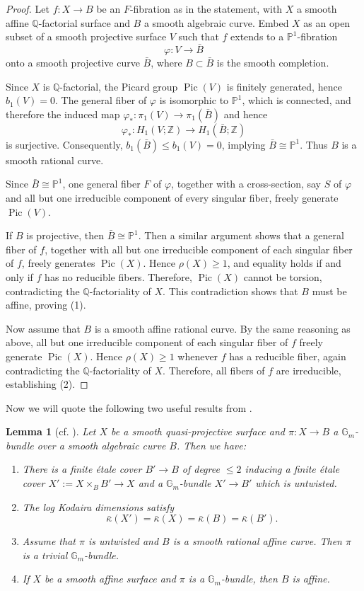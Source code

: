 \documentclass[12pt,reqno,twoside]{amsart}
\newtheorem{lemma}[theorem]{Lemma}
\theoremstyle{definition}
\numberwithin{equation}{section}
\newcommand{\G}{\mathbb{G}}
\newcommand{\Q}{\mathbb{Q}}
\newcommand{\Z}{\mathbb{Z}}
\newcommand{\Kbar}{\bar{\kappa}}
\newcommand{\PP}{\mathbb{P}}
\newcommand{\Pic}{\operatorname{Pic}}
\begin{document}
\begin{proof}
Let $f : X \to B$ be an $F$-fibration as in the statement, with $X$ a smooth affine $\Q$-factorial surface and $B$ a smooth algebraic curve. Embed $X$ as an open subset of a smooth projective surface $V$ such that $f$ extends to a $\PP^1$-fibration 
\[
\varphi : V \to \bar{B}
\]
onto a smooth projective curve $\bar{B}$, where $B \subset \bar{B}$ is the smooth completion.

Since $X$ is $\Q$-factorial, the Picard group $\Pic(V)$ is finitely generated, hence $b_1(V)=0$. The general fiber of $\varphi$ is isomorphic to $\PP^1$, which is connected, and therefore the induced map $\varphi_\ast : \pi_1(V) \to \pi_1(\bar{B})$ and hence
\[
\varphi_\ast : H_1(V; \Z) \to H_1(\bar{B}; \Z)
\]
is surjective. Consequently, $b_1(\bar{B}) \le b_1(V) = 0$, implying $\bar{B} \cong \PP^1$. Thus $B$ is a smooth rational curve.

Since $\bar{B} \cong \PP^1$, one general fiber $F$ of $\varphi$, together with a cross-section, say $S$ of $\varphi$ and all but one irreducible component of every singular fiber, freely generate $\Pic(V)$.  

If $B$ is projective, then $\bar{B} \cong \PP^1$. Then a similar argument shows that a general fiber of $f$, together with all but one irreducible component of each singular fiber of $f$, freely generates $\Pic(X)$. Hence $\rho(X) \ge 1$, and equality holds if and only if $f$ has no reducible fibers. Therefore, $\Pic(X)$ cannot be torsion, contradicting the $\Q$-factoriality of $X$. This contradiction shows that $B$ must be affine, proving (1).

Now assume that $B$ is a smooth affine rational curve. By the same reasoning as above, all but one irreducible component of each singular fiber of $f$ freely generate $\Pic(X)$. Hence $\rho(X) \ge 1$ whenever $f$ has a reducible fiber, again contradicting the $\Q$-factoriality of $X$. Therefore, all fibers of $f$ are irreducible, establishing (2).
\end{proof}


Now we will quote the following two useful results from \cite{JSXZ2024}. 

\begin{lemma}[{cf. \cite[Lemma 2.6, Corollary 2.7]{JSXZ2024}}]
Let $X$ be a smooth quasi-projective surface and $\pi : X \to B$ a $\G_m$-bundle over a smooth algebraic curve $B$. Then we have:
\begin{enumerate}[\indent\rm(1)]
    \item There is a finite {\'e}tale cover $B'\to B$ of degree $\leq 2$ inducing a finite {\'e}tale cover $X' := X \times_{B} B' \to X$ and a $\G_m$-bundle $X' \to B'$ which is untwisted.
    \item The log Kodaira dimensions satisfy $$\Kbar(X') = \Kbar(X) = \Kbar(B) = \Kbar(B').$$
    \item Assume that $\pi$ is untwisted and $B$ is a smooth rational affine curve. Then $\pi$ is a trivial $\G_m$-bundle.
    \item If $X$ be a smooth affine surface and $\pi$ is a $\G_m$-bundle, then $B$ is affine.
\end{enumerate}
\end{lemma}
\end{document}
